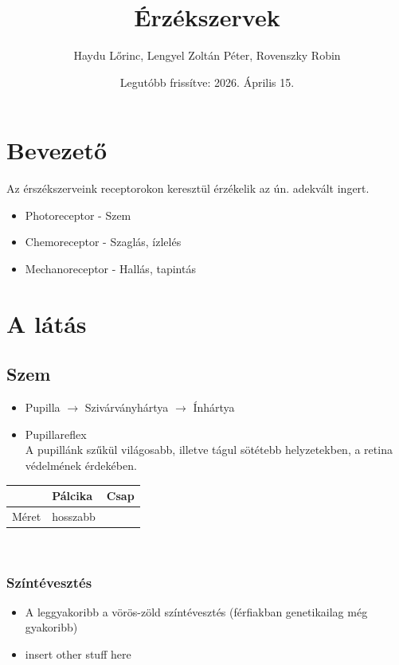 \documentclass{article}
\title{Érzékszervek}
\author{Haydu Lőrinc, Lengyel Zoltán Péter, Rovenszky Robin}
\date{Legutóbb frissítve: 2026. Április 15.}
\begin{document}
\maketitle
\tableofcontents
\newpage

\section{Bevezető}
Az érszékszerveink receptorokon keresztül érzékelik az ún. adekvált ingert.

\begin{itemize}
    \item Photoreceptor - Szem
    \item Chemoreceptor - Szaglás, ízlelés
    \item Mechanoreceptor - Hallás, tapintás
\end{itemize}

\section{A látás}
\subsection{Szem}


\begin{itemize}
    \item Pupilla $\rightarrow$ Szivárványhártya $\rightarrow$ Ínhártya
    \item Pupillareflex\\ A pupillánk szűkül világosabb, illetve tágul sötétebb helyzetekben, a retina védelmének érdekében.
\end{itemize}

\begin{tabular}{|l|l|l|} \hline
     & Pálcika & Csap \\ \hline
     Méret & hosszabb & \\
\end{tabular}
\


\subsubsection{Színtévesztés}
\begin{itemize}
    \item A leggyakoribb a vörös-zöld színtévesztés (férfiakban genetikailag még gyakoribb)
    \item insert other stuff here
\end{itemize}
\end{document}
